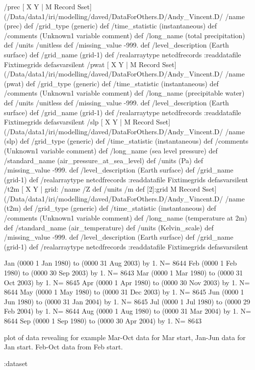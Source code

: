 \begin{ingrid}
/prec{
[  X Y | M Record Sset] (/Data/data1/iri/modelling/daved/DataForOthers.D/Andy_Vincent.D/%
/name (prec) def
 /grid_type (generic) def
 /time_statistic (instantaneous) def
 /comments (Unknown1 variable comment) def
 /long_name (total precipitation) def
 /units /unitless def
 /missing_value -999. def
 /level_description (Earth surface) def
 /grid_name (grid-1) def
 /realarraytype netcdfrecords :readdatafile Fixtimegrids
}defasvarsilent
 /pwat{
[  X Y | M Record Sset] (/Data/data1/iri/modelling/daved/DataForOthers.D/Andy_Vincent.D/%
/name (pwat) def
 /grid_type (generic) def
 /time_statistic (instantaneous) def
 /comments (Unknown1 variable comment) def
 /long_name (precipitable water) def
 /units /unitless def
 /missing_value -999. def
 /level_description (Earth surface) def
 /grid_name (grid-1) def
 /realarraytype netcdfrecords :readdatafile Fixtimegrids
}defasvarsilent
 /slp{
[  X Y | M Record Sset] (/Data/data1/iri/modelling/daved/DataForOthers.D/Andy_Vincent.D/%
/name (slp) def
 /grid_type (generic) def
 /time_statistic (instantaneous) def
 /comments (Unknown1 variable comment) def
 /long_name (sea level pressure) def
/standard_name (air_pressure_at_sea_level) def
 /units (Pa) def
 /missing_value -999. def
 /level_description (Earth surface) def
 /grid_name (grid-1) def
 /realarraytype netcdfrecords :readdatafile Fixtimegrids
}defasvarsilent
 /t2m{
[  X Y | grid:
       /name /Z def
       /units /m def
       [2]:grid 
     M Record Sset] (/Data/data1/iri/modelling/daved/DataForOthers.D/Andy_Vincent.D/%
/name (t2m) def
 /grid_type (generic) def
 /time_statistic (instantaneous) def
 /comments (Unknown1 variable comment) def
 /long_name (temperature at 2m) def
 /standard_name (air_temperature) def
 /units (Kelvin_scale) def
 /missing_value -999. def
 /level_description (Earth surface) def
 /grid_name (grid-1) def
 /realarraytype netcdfrecords :readdatafile Fixtimegrids
}defasvarsilent
\end{ingrid}
Jan (0000 1 Jan 1980) to (0000 31 Aug 2003) by 1. N= 8644
Feb (0000 1 Feb 1980) to (0000 30 Sep 2003) by 1. N= 8643
Mar (0000 1 Mar 1980) to (0000 31 Oct 2003) by 1. N= 8645
Apr (0000 1 Apr 1980) to (0000 30 Nov 2003) by 1. N= 8644
May (0000 1 May 1980) to (0000 31 Dec 2003) by 1. N= 8645
Jun (0000 1 Jun 1980) to (0000 31 Jan 2004) by 1. N= 8645 
Jul (0000 1 Jul 1980) to (0000 29 Feb 2004) by 1. N= 8644
Aug (0000 1 Aug 1980) to (0000 31 Mar 2004) by 1. N= 8644
Sep (0000 1 Sep 1980) to (0000 30 Apr 2004) by 1. N= 8643

plot of data revealing for example Mar-Oct data for Mar start,
Jan-Jun data for Jan start.
Feb-Oct data from Feb start.
\begin{ingrid}
:dataset
\end{ingrid}
